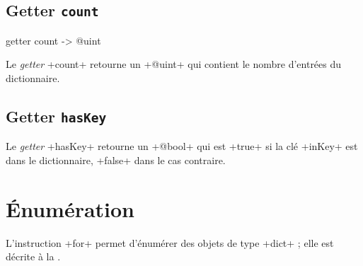 \subsection{Getter \texttt{count}}

\begin{galgas}
getter count -> @uint
\end{galgas}


Le \emph{getter} \ggs+count+ retourne un \ggs+@uint+ qui contient le nombre d'entrées du dictionnaire.



\subsection{Getter \texttt{hasKey}}


Le \emph{getter} \ggs+hasKey+ retourne un \ggs+@bool+ qui est \ggs+true+ si la clé \ggs+inKey+ est dans le dictionnaire, \ggs+false+ dans le cas contraire.



%
%
%



%
%
%

















\section{Énumération}

L'instruction \ggs+for+ permet d'énumérer des objets de type \ggs+dict+ ; elle est décrite à la .

